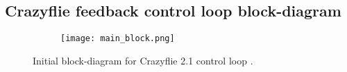 \documentclass[10pt, a4paper]{article}
\begin{document}
\newpage
\begin{appendices}

\section{Crazyflie feedback control loop block-diagram}
\label{appendix:previous-block-diagram}
    \begin{figure}[hbt!]
        \centering
        \begin{subfigure}[b]{0.94\textwidth}
            \centering
            \texttt{[image: main\_block.png]}    
        \end{subfigure}
        \caption{Initial block-diagram for Crazyflie 2.1 control loop \cite{report:cse303-report}.}
        \label{figure:previous-block-diagram}
    \end{figure}


\end{appendices}
\end{document}
